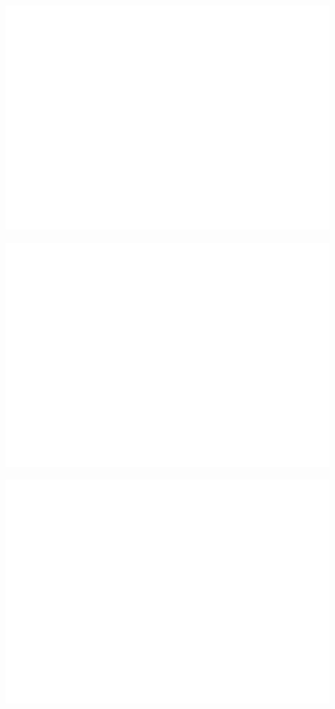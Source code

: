 \documentclass[
]{article}
\begin{document}
\includegraphics{votovalencianista-ea2023_files/figure-latex/especificacionesHipotesis1-1.png}

\includegraphics{votovalencianista-ea2023_files/figure-latex/especificacionesHipotesis2-1.png}

\includegraphics{votovalencianista-ea2023_files/figure-latex/especificacionesHipotesis3-1.png}
\end{document}
